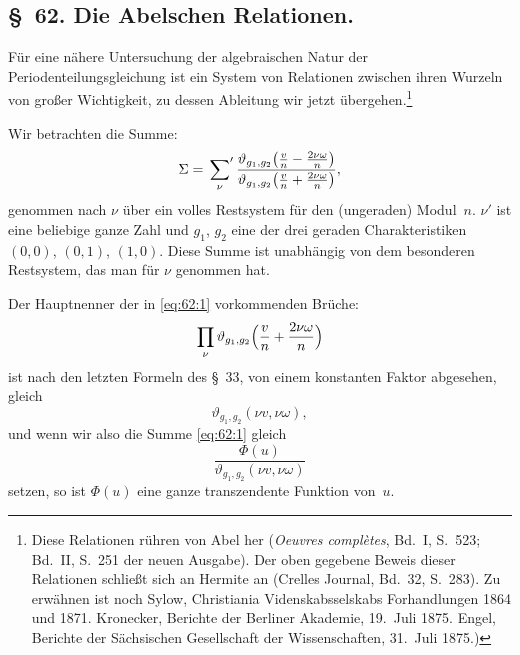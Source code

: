 \documentclass[11pt,a4paper]{article}
\theoremstyle{plain}
\theoremstyle{remark}
\begin{document}
\subsection*{§~62. Die Abelschen Relationen.}

Für eine nähere Untersuchung der algebraischen Natur der
Periodenteilungsgleichung ist ein System von Relationen zwischen
ihren Wurzeln von großer Wichtigkeit, zu dessen Ableitung wir
jetzt übergehen.\footnote{Diese Relationen rühren von Abel her
(\textit{Oeuvres complètes}, Bd.~I, S.~523; Bd.~II, S.~251 der
neuen Ausgabe). Der oben gegebene Beweis dieser Relationen
schließt sich an Hermite an (Crelles Journal, Bd.~32, S.~283).
Zu erwähnen ist noch Sylow, Christiania Videnskabsselskabs
Forhandlungen 1864 und 1871. Kronecker, Berichte der Berliner
Akademie, 19.~Juli 1875. Engel, Berichte der Sächsischen
Gesellschaft der Wissenschaften, 31.~Juli 1875.)}

Wir betrachten die Summe:
\begin{equation}\label{eq:62:1}
\Sigma = \sideset{}{'}\sum_{\nu}
\frac{\vartheta_{g_1,g_2}\bigl(\frac{v}{n}-\frac{2\nu\omega}{n}\bigr)}
     {\vartheta_{g_1,g_2}\bigl(\frac{v}{n}+\frac{2\nu\omega}{n}\bigr)},
\end{equation}
genommen nach $\nu$ über ein volles Restsystem für den
(ungeraden) Modul~$n$. $\nu'$ ist eine beliebige ganze Zahl und
$g_1$, $g_2$ eine der drei geraden Charakteristiken $(0,0)$,
$(0,1)$, $(1,0)$. Diese Summe ist unabhängig von dem
besonderen Restsystem, das man für $\nu$ genommen hat.

Der Hauptnenner der in \eqref{eq:62:1} vorkommenden Brüche:
\[
\prod_{\nu}\vartheta_{g_1,g_2}\Bigl(\frac{v}{n}+\frac{2\nu\omega}{n}\Bigr)
\]
ist nach den letzten Formeln des §~33, von einem konstanten
Faktor abgesehen, gleich
\[
\vartheta_{g_1,g_2}(\nu v, \nu\omega),
\]
und wenn wir also die Summe \eqref{eq:62:1} gleich
\begin{equation}\label{eq:62:2}
\frac{\Phi(u)}{\vartheta_{g_1,g_2}(\nu v, \nu\omega)}
\end{equation}
setzen, so ist $\Phi(u)$ eine ganze transzendente Funktion von~$u$.
\end{document}
